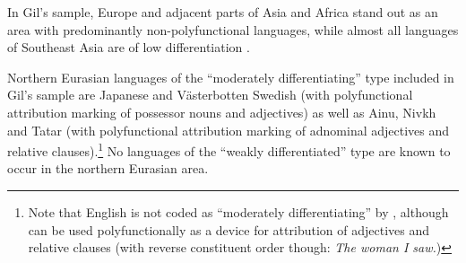 In Gil's sample, Europe and adjacent parts of Asia and Africa stand out as an area with predominantly non-polyfunctional languages, while almost all languages of Southeast Asia are of low differentiation \citep[8]{gil2005}.

Northern Eurasian languages of the “moderately differentiating” type included in Gil's sample are Japanese and Västerbotten Swedish (with polyfunctional attribution marking of possessor nouns and adjectives) as well as Ainu, Nivkh and Tatar (with polyfunctional attribution marking of adnominal adjectives and relative clauses).\footnote{Note that English is not coded as “moderately differentiating” by \citet{gil2005}, although  can be used polyfunctionally as a device for attribution of adjectives and relative clauses (with reverse constituent order though: \textit{The woman I saw.})} No languages of the “weakly differentiated” type are known to occur in the northern Eurasian area. 
